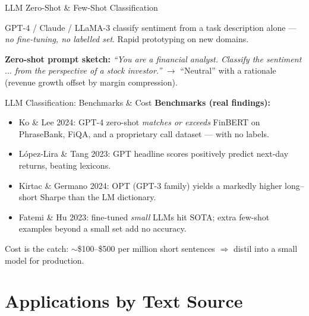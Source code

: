 \documentclass[9pt,t]{beamer}
\begin{document}
\begin{frame}{LLM Zero-Shot \& Few-Shot Classification}
\begin{bigpicture}
GPT-4 / Claude / LLaMA-3 classify sentiment from a task description alone ---
\emph{no fine-tuning, no labelled set}. Rapid prototyping on new domains.
\end{bigpicture}

\medskip
\textbf{Zero-shot prompt sketch:} \emph{``You are a financial analyst. Classify the
sentiment $\ldots$ from the perspective of a stock investor.''} $\to$ ``Neutral'' with
a rationale (revenue growth offset by margin compression).
\end{frame}

\begin{frame}{LLM Classification: Benchmarks \& Cost}
\textbf{Benchmarks (real findings):}
\begin{itemize}\small
  \item Ko \& Lee 2024: GPT-4 zero-shot \emph{matches or exceeds} FinBERT on
        PhraseBank, FiQA, and a proprietary call dataset --- with no labels.
  \item L\'opez-Lira \& Tang 2023: GPT headline scores positively predict
        next-day returns, beating lexicons.
  \item Kirtac \& Germano 2024: OPT (GPT-3 family) yields a markedly higher
        long--short Sharpe than the LM dictionary.
  \item Fatemi \& Hu 2023: fine-tuned \emph{small} LLMs hit SOTA; extra few-shot
        examples beyond a small set add no accuracy.
\end{itemize}

\medskip
\alert{Cost is the catch:} $\sim$\$100--\$500 per million short sentences $\Rightarrow$
distil into a small model for production.
\end{frame}

\section{Applications by Text Source}
\end{document}
